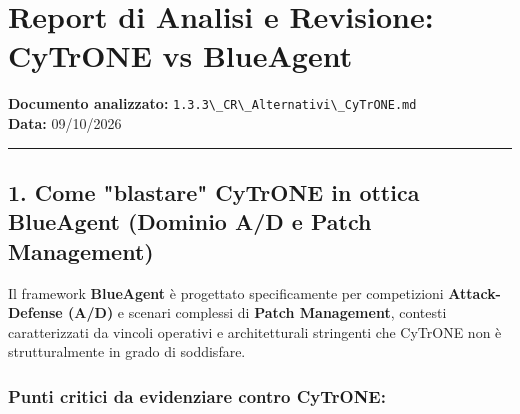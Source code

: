 \section{Report di Analisi e Revisione: CyTrONE vs
BlueAgent}\label{report-di-analisi-e-revisione-cytrone-vs-blueagent}

\textbf{Documento analizzato:}
\passthrough{\lstinline!1.3.3\_CR\_Alternativi\_CyTrONE.md!}\\
\textbf{Data:} 09/10/2026

\begin{center}\rule{0.5\linewidth}{0.5pt}\end{center}

\subsection{1. Come "blastare" CyTrONE in ottica BlueAgent (Dominio A/D
e Patch
Management)}\label{1-come-blastare-cytrone-in-ottica-blueagent-dominio-ad-e-patch-management}

Il framework \textbf{BlueAgent} è progettato specificamente per
competizioni \textbf{Attack-Defense (A/D)} e scenari complessi di
\textbf{Patch Management}, contesti caratterizzati da vincoli operativi
e architetturali stringenti che CyTrONE non è strutturalmente in grado
di soddisfare.

\subsubsection{Punti critici da evidenziare contro
CyTrONE:}\label{punti-critici-da-evidenziare-contro-cytrone}

